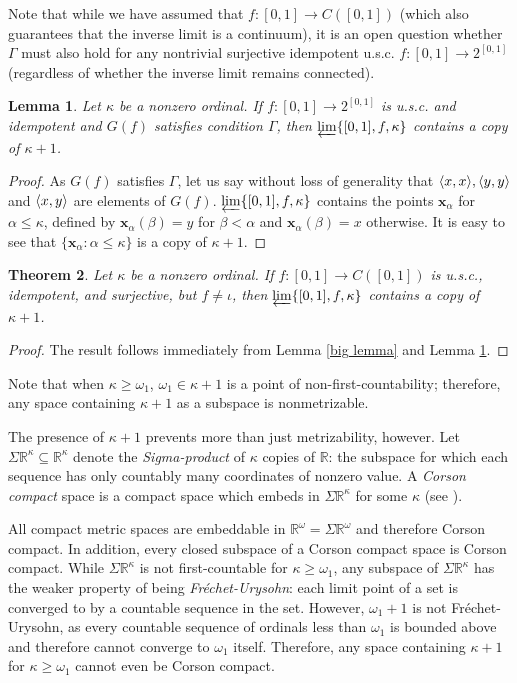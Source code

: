 \documentclass{amsart}
\newtheorem{theorem}{Theorem}[section]
\newtheorem{lemma}[theorem]{Lemma}
\theoremstyle{definition}
\begin{document}
Note that while we have assumed that $f:[0,1]\to C([0,1])$ (which also guarantees that the inverse limit is a continuum), it is an open question whether $\Gamma$ must also hold for any nontrivial surjective idempotent u.s.c. $f:[0,1]\to 2^{[0,1]}$ (regardless of whether the inverse limit remains connected).

\begin{lemma} \label{general lemma}
Let $\kappa$ be a nonzero ordinal. If $f:[0,1] \to 2^{[0,1]}$ is u.s.c. and idempotent and $G(f)$ satisfies condition $\Gamma$, then $\varprojlim\{[0,1],f,\kappa\}$ contains a copy of $\kappa + 1$.
\end{lemma}

\begin{proof}
As $G(f)$ satisfies $\Gamma$, let us say without loss of generality that $\langle x,x\rangle, \langle y,y\rangle$ and $\langle x,y\rangle$ are elements of $G(f)$. $\varprojlim\{[0,1],f,\kappa\}$ contains the points $\textbf{x}_\alpha$ for $\alpha\leq\kappa$, defined by $\textbf{x}_\alpha(\beta)=y$ for $\beta<\alpha$ and $\textbf{x}_\alpha(\beta)=x$ otherwise. It is easy to see that $\{\textbf{x}_\alpha:\alpha\leq\kappa\}$ is a copy of $\kappa+1$.
\end{proof}

\begin{theorem} \label{main theorem}
Let $\kappa$ be a nonzero ordinal. If $f:[0,1]\to C([0,1])$ is u.s.c., idempotent, and surjective, but $f\not=\iota$, then $\varprojlim\{[0,1],f,\kappa\}$ contains a copy of $\kappa+1$.
\end{theorem}

\begin{proof}
The result follows immediately from Lemma \ref{big lemma} and Lemma \ref{general lemma}.
\end{proof}

Note that when $\kappa\geq\omega_1$, $\omega_1\in\kappa+1$ is a point of non-first-countability; therefore, any space containing $\kappa+1$ as a subspace is nonmetrizable.

The presence of $\kappa+1$ prevents more than just metrizability, however. Let $\Sigma\mathbb R^\kappa\subseteq \mathbb R^\kappa$ denote the \textit{Sigma-product} of $\kappa$ copies of $\mathbb R$: the subspace for which each sequence has only countably many coordinates of nonzero value. A \textit{Corson compact} space is a compact space which embeds in $\Sigma\mathbb R^\kappa$ for some $\kappa$ (see \cite{alster}).

All compact metric spaces are embeddable in $\mathbb R^\omega=\Sigma\mathbb R^\omega$ and therefore Corson compact. In addition, every closed subspace of a Corson compact space is Corson compact. While $\Sigma\mathbb R^\kappa$ is not first-countable for $\kappa\geq\omega_1$, any subspace of $\Sigma\mathbb R^\kappa$ has the weaker property of being \textit{Fr\'echet-Urysohn}: each limit point of a set is converged to by a countable sequence in the set. However, $\omega_1+1$ is not Fr\'echet-Urysohn, as every countable sequence of ordinals less than $\omega_1$ is bounded above and therefore cannot converge to $\omega_1$ itself. Therefore, any space containing $\kappa+1$ for $\kappa\geq\omega_1$ cannot even be Corson compact.
\end{document}
